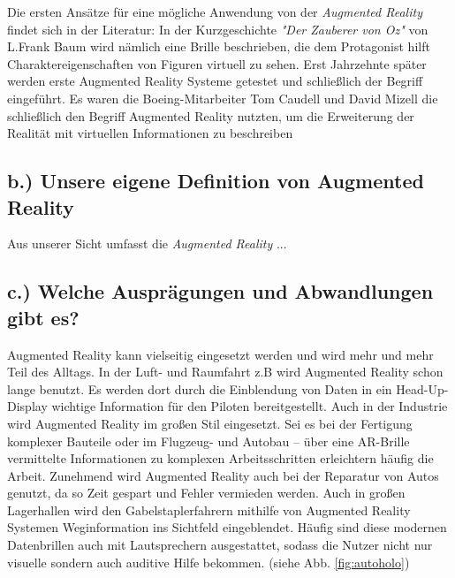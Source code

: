 \documentclass[12pt,utf8]{scrartcl}
\begin{document}
\begin{flushleft}
Die ersten Ansätze für eine mögliche Anwendung von der \textit{Augmented Reality} findet sich in der Literatur: In der Kurzgeschichte \textit{"Der Zauberer von Oz"} von L.Frank Baum wird nämlich eine Brille beschrieben, die dem Protagonist hilft Charaktereigenschaften von Figuren virtuell zu sehen\cite{onlineAR}. Erst Jahrzehnte später werden erste Augmented Reality Systeme getestet und schließlich der Begriff eingeführt. Es waren die Boeing-Mitarbeiter Tom Caudell und David Mizell die schließlich den Begriff Augmented Reality nutzten, um die Erweiterung der Realität mit virtuellen Informationen zu beschreiben\cite{TomDavid.}


\subsection*{\label{sub2:thema}b.) Unsere eigene Definition von Augmented Reality}
Aus unserer Sicht umfasst die \textit{Augmented Reality} ...

\subsection*{\label{sub3:thema}c.) Welche Ausprägungen und Abwandlungen gibt es?}
Augmented Reality kann vielseitig eingesetzt werden und wird mehr und mehr Teil des Alltags. In der Luft- und Raumfahrt z.B wird Augmented Reality schon lange benutzt. Es werden dort durch die Einblendung von Daten in ein Head-Up-Display wichtige Information für den Piloten bereitgestellt. Auch in der Industrie wird Augmented Reality im großen Stil eingesetzt. Sei es bei der Fertigung komplexer Bauteile oder im Flugzeug- und Autobau – über eine AR-Brille vermittelte Informationen zu komplexen Arbeitsschritten erleichtern häufig die Arbeit. Zunehmend wird Augmented Reality auch bei der Reparatur von Autos genutzt, da so Zeit gespart und Fehler vermieden werden. Auch in großen Lagerhallen wird den Gabelstaplerfahrern mithilfe von Augmented Reality Systemen Weginformation ins Sichtfeld eingeblendet. Häufig sind diese modernen Datenbrillen auch mit Lautsprechern ausgestattet, sodass die Nutzer nicht nur visuelle sondern auch auditive Hilfe bekommen. (siehe Abb. \ref{fig:autoholo})
\linebreak


\end{flushleft}
\end{document}
